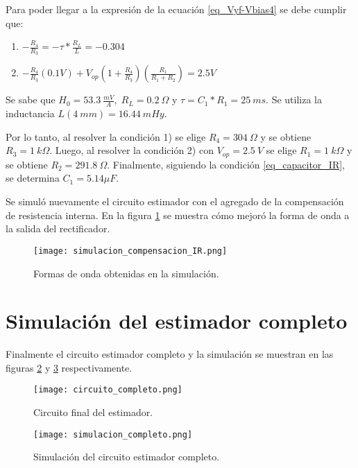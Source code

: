 Para poder llegar a la expresión de la ecuación \ref{eq_Vyf-Vbias4} se debe cumplir que:

\begin{enumerate}
	\item  $-\frac{R_4}{R_3}=- \tau *\frac{R_L}{L}= -0.304$  
	
	\item  $-\frac{R_4}{R_3}(0.1V)+V_{op}(1+\frac{ R_4}{R_3})(\frac{R_1}{R_1+R_2}) = 2.5V$     
\end{enumerate}

Se sabe que $H_0 = 53.3\:\frac{mV}{A},\; R_L = 0.2\:\Omega$ y $\tau=C_1*R_1=25 \:ms$. Se utiliza la inductancia $L(4\:mm) = 16.44\:mHy$.

Por lo tanto, al resolver la condición 1) se elige $R_4 = 304\: \Omega$ y se obtiene $R_3=1\:k\Omega$. Luego, al resolver la condición 2) con $V_{op}=2.5\:V$ se elige $R_1=1\:k\Omega$ y se obtiene $R_{2}=291.8\:\Omega$. Finalmente, siguiendo la condición \ref{eq_capacitor_IR}, se determina $C_1=5.14\mu F$.

Se simuló nuevamente el circuito estimador con el agregado de la compensación de resistencia interna. En la figura \ref{fig:img_Formas_de_onda_obtenidas_en_la_simulación} se muestra cómo mejoró la forma de onda a la salida del rectificador.

\begin{figure}[H]
	\centering
	\texttt{[image: simulacion\_compensacion\_IR.png]}
	\caption{Formas de onda obtenidas en la simulación.}
	\label{fig:img_Formas_de_onda_obtenidas_en_la_simulación}
\end{figure}


\section{Simulación del estimador completo}
\label{seccopn-estim-completo}

Finalmente el circuito estimador completo y la simulación se muestran en las figuras \ref{fig:img_circuito_final_del_estimador} y \ref{fig:img_simulacion_completo} respectivamente.

\begin{figure}[H]
\centering
\texttt{[image: circuito\_completo.png]}
\caption{Circuito final del estimador.}
\label{fig:img_circuito_final_del_estimador}
\end{figure}

\begin{figure}[H]
	\centering
	\texttt{[image: simulacion\_completo.png]}
	\caption{Simulación del circuito estimador completo.}
	\label{fig:img_simulacion_completo}
\end{figure}

